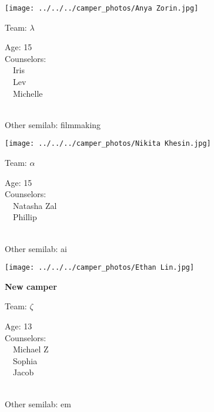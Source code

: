 \documentclass[10pt,letterpaper, landscape]{article}
\begin{document}
\horizontalshiftfornextsticker
\renewcommand{\baselinestretch}{1} \begin{sticker}
\noindent\begin{minipage}{0.5\textwidth}\texttt{[image: ../../../camper\_photos/Anya Zorin.jpg]}\end{minipage}\begin{minipage}{0.45\textwidth}
Team: {\Large $\lambda$}

Age:        15\\
Counselors: \\\ \ Iris\\\ \ Lev\\\ \ Michelle\\
\end{minipage} \\ \vspace{0.07in}
Other semilab: filmmaking
\end{sticker}
\verticalshiftfornextsticker
\renewcommand{\baselinestretch}{1} \begin{sticker}
\noindent\begin{minipage}{0.5\textwidth}\texttt{[image: ../../../camper\_photos/Nikita Khesin.jpg]}\end{minipage}\begin{minipage}{0.45\textwidth}
Team: {\Large $\alpha$}

Age:        15\\
Counselors: \\\ \ Natasha Zal\\\ \ Phillip\\
\end{minipage} \\ \vspace{0.07in}
Other semilab: ai
\end{sticker}
\horizontalshiftfornextsticker
\renewcommand{\baselinestretch}{1} \begin{sticker}
\noindent\begin{minipage}{0.5\textwidth}\texttt{[image: ../../../camper\_photos/Ethan Lin.jpg]}\end{minipage}\begin{minipage}{0.45\textwidth}
\textbf{New camper} 

Team: {\Large $\zeta$}

Age:        13\\
Counselors: \\\ \ Michael Z\\\ \ Sophia\\\ \ Jacob\\
\end{minipage} \\ \vspace{0.07in}
Other semilab: em
\end{sticker}
\end{document}
